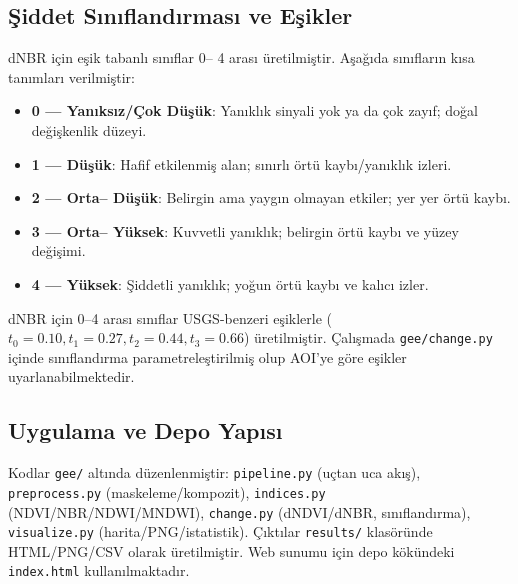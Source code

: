 \documentclass[11pt,a4paper]{article}
\begin{document}
\subsection{Şiddet Sınıflandırması ve Eşikler}
dNBR için eşik tabanlı sınıflar 0-- 4 arası üretilmiştir. Aşağıda sınıfların kısa tanımları verilmiştir:
\begin{itemize}
  \item \textbf{0 --- Yanıksız/Çok Düşük}: Yanıklık sinyali yok ya da çok zayıf; doğal değişkenlik düzeyi.
  \item \textbf{1 --- Düşük}: Hafif etkilenmiş alan; sınırlı örtü kaybı/yanıklık izleri.
  \item \textbf{2 --- Orta-- Düşük}: Belirgin ama yaygın olmayan etkiler; yer yer örtü kaybı.
  \item \textbf{3 --- Orta-- Yüksek}: Kuvvetli yanıklık; belirgin örtü kaybı ve yüzey değişimi.
  \item \textbf{4 --- Yüksek}: Şiddetli yanıklık; yoğun örtü kaybı ve kalıcı izler.
\end{itemize}
dNBR için 0--4 arası sınıflar USGS-benzeri eşiklerle (\(t_0=0.10, t_1=0.27, t_2=0.44, t_3=0.66\)) üretilmiştir. Çalışmada \texttt{gee/change.py} içinde sınıflandırma parametreleştirilmiş olup AOI'ye göre eşikler uyarlanabilmektedir.

\subsection{Uygulama ve Depo Yapısı}
Kodlar \texttt{gee/} altında düzenlenmiştir: \texttt{pipeline.py} (uçtan uca akış), \texttt{preprocess.py} (maskeleme/kompozit), \texttt{indices.py} (NDVI/NBR/NDWI/MNDWI), \texttt{change.py} (dNDVI/dNBR, sınıflandırma), \texttt{visualize.py} (harita/PNG/istatistik). Çıktılar \texttt{results/} klasöründe HTML/PNG/CSV olarak üretilmiştir. Web sunumu için depo kökündeki \texttt{index.html} kullanılmaktadır.
\end{document}

